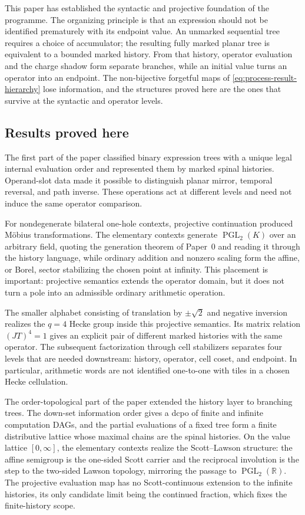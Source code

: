 This paper has established the syntactic and projective foundation of the
programme.  The organizing principle is that an expression should not be
identified prematurely with its endpoint value.  An unmarked sequential tree
requires a choice of accumulator; the resulting fully marked planar tree is
equivalent to a bounded marked history.  From that history, operator evaluation
and the charge shadow form separate branches, while an initial value turns an
operator into an endpoint.  The non-bijective forgetful maps of
\eqref{eq:process-result-hierarchy} lose information, and the structures proved
here are the ones that survive at the syntactic and operator levels.

\subsection{Results proved here}

The first part of the paper classified binary expression trees with a unique
legal internal evaluation order and represented them by marked spinal
histories.  Operand-slot data made it possible to distinguish planar mirror,
temporal reversal, and path inverse.  These operations act at different levels
and need not induce the same operator comparison.

For nondegenerate bilateral one-hole contexts, projective continuation produced
M\"obius transformations.  The elementary contexts generate
$\operatorname{PGL}_2(K)$ over an arbitrary field, quoting the generation theorem
of Paper~0 and reading it through the history language, while ordinary addition
and nonzero scaling form the affine, or Borel, sector stabilizing the chosen
point at infinity.  This placement is important: projective semantics extends the
operator domain, but it does not turn a pole into an admissible ordinary
arithmetic operation.

The smaller alphabet consisting of translation by $\pm\sqrt2$ and negative
inversion realizes the $q=4$ Hecke group inside this projective semantics.  Its
matrix relation $(JT)^4=1$ gives an explicit pair of different marked histories
with the same operator.  The subsequent factorization through cell stabilizers
separates four levels that are needed downstream: history, operator, cell coset,
and endpoint.  In particular, arithmetic words are not identified one-to-one
with tiles in a chosen Hecke cellulation.

The order-topological part of the paper extended the history layer to branching
trees.  The down-set information order gives a dcpo of finite and infinite
computation DAGs, and the partial evaluations of a fixed tree form a finite
distributive lattice whose maximal chains are the spinal histories.  On the
value lattice $[0,\infty]$, the elementary contexts realize the Scott--Lawson
structure: the affine semigroup is the one-sided Scott carrier and the reciprocal
involution is the step to the two-sided Lawson topology, mirroring the passage to
$\operatorname{PGL}_2(\mathbb R)$.  The projective evaluation map has no
Scott-continuous extension to the infinite histories, its only candidate limit
being the continued fraction, which fixes the finite-history scope.

